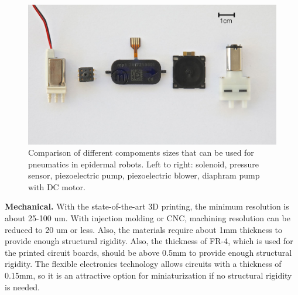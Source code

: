 \begin{figure}[!ht]
\centering
\includegraphics[width=14.0cm]{pictures/chapter6/different_pumps_sizes.pdf}
\caption{Comparison of different compoments sizes that can be used for pneumatics in epidermal robots. Left to right: solenoid, pressure sensor, piezoelectric pump, piezoelectric blower, diaphram pump with DC motor. }
\label{fig:pumps}
\end{figure}

\textbf{Mechanical.}
With the state-of-the-art  3D printing, the minimum resolution is about 25-100 um. With injection molding or CNC, machining resolution can be reduced to 20 um or less. Also, the materials require about 1mm thickness to provide enough structural rigidity. Also, the thickness of FR-4, which is used for the printed circuit boards, should be above 0.5mm to provide enough structural rigidity. The flexible electronics technology allows circuits with a thickness of 0.15mm, so it is an attractive option for miniaturization if no structural rigidity is needed. 

